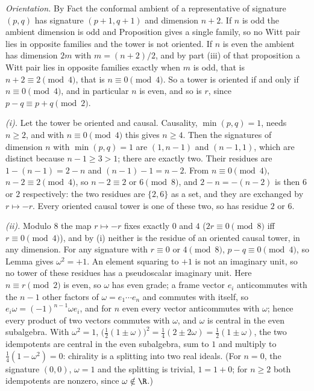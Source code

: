 \emph{Orientation.} By Fact  the conformal ambient of a representative of signature $(p,q)$ has signature $(p+1, q+1)$ and dimension $n + 2$. If $n$ is odd the ambient dimension is odd and Proposition  gives a single family, so no Witt pair lies in opposite families and the tower is not oriented. If $n$ is even the ambient has dimension $2m$ with $m = (n+2)/2$, and by part (iii) of that proposition a Witt pair lies in opposite families exactly when $m$ is odd, that is $n + 2 \equiv 2 \pmod 4$, that is $n \equiv 0 \pmod 4$. So a tower is oriented if and only if $n \equiv 0 \pmod 4$, and in particular $n$ is even, and so is $r$, since $p - q \equiv p + q \pmod 2$.

\emph{(i).} Let the tower be oriented and causal. Causality, $\min(p,q) = 1$, needs $n \ge 2$, and with $n \equiv 0 \pmod 4$ this gives $n \ge 4$. Then the signatures of dimension $n$ with $\min(p,q) = 1$ are $(1, n-1)$ and $(n-1, 1)$, which are distinct because $n - 1 \ge 3 > 1$; there are exactly two. Their residues are $1 - (n-1) = 2 - n$ and $(n-1) - 1 = n - 2$. From $n \equiv 0 \pmod 4$, $n - 2 \equiv 2 \pmod 4$, so $n - 2 \equiv 2$ or $6 \pmod 8$, and $2 - n = -(n-2)$ is then $6$ or $2$ respectively: the two residues are $\{2, 6\}$ as a set, and they are exchanged by $r \mapsto -r$. Every oriented causal tower is one of these two, so has residue $2$ or $6$.

\emph{(ii).} Modulo $8$ the map $r \mapsto -r$ fixes exactly $0$ and $4$ ($2r \equiv 0 \pmod 8$ iff $r \equiv 0 \pmod 4$), and by (i) neither is the residue of an oriented causal tower, in any dimension. For any signature with $r \equiv 0$ or $4 \pmod 8$, $p - q \equiv 0 \pmod 4$, so Lemma  gives $\omega^{2} = +1$. An element squaring to $+1$ is not an imaginary unit, so no tower of these residues has a pseudoscalar imaginary unit. Here $n \equiv r \pmod 2$ is even, so $\omega$ has even grade; a frame vector $e_{i}$ anticommutes with the $n - 1$ other factors of $\omega = e_{1} \cdots e_{n}$ and commutes with itself, so $e_{i}\omega = (-1)^{n-1}\omega e_{i}$, and for $n$ even every vector anticommutes with $\omega$; hence every product of two vectors commutes with $\omega$, and $\omega$ is central in the even subalgebra. With $\omega^{2} = 1$, $\bigl(\tfrac12(1 \pm \omega)\bigr)^{2} = \tfrac14(2 \pm 2\omega) = \tfrac12(1 \pm \omega)$, the two idempotents are central in the even subalgebra, sum to $1$ and multiply to $\tfrac14(1 - \omega^{2}) = 0$: chirality is a splitting into two real ideals. (For $n = 0$, the signature $(0,0)$, $\omega = 1$ and the splitting is trivial, $1 = 1 + 0$; for $n \ge 2$ both idempotents are nonzero, since $\omega \notin \R$.)

